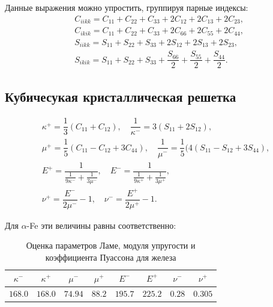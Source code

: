 \documentclass[12pt,a4paper]{article}
\begin{document}
 Данные выражения можно упростить, группируя парные индексы:
 \[
    \begin{split}
        &C_{iikk} = C_{11} + C_{22} + C_{33} + 2C_{12} + 2C_{13} + 2C_{23},
        \\
        &C_{ikik} = C_{11} + C_{22} + C_{33} + 2C_{66} + 2C_{55} + 2C_{44},
        \\
        &S_{iikk} = S_{11} + S_{22} + S_{33} + 2S_{12} + 2S_{13} + 2S_{23},
        \\
        &S_{ikik} = S_{11} + S_{22} + S_{33} + \dfrac{S_{66}}{2} + \dfrac{S_{55}}{2} + \dfrac{S_{44}}{2}.
    \end{split}
 \]

 \subsection{Кубичесукая кристаллическая решетка}
 \begin{gather*}
    \kappa^+ = \dfrac{1}{3}(C_{11} + C_{12}), \quad \dfrac{1}{\kappa^-} = 3(S_{11} + 2S_{12}),
    \\[0.7em]
    \mu^+ = \dfrac{1}{5}(C_{11} - C_{12} + 3C_{44}), \quad \dfrac{1}{\mu^-} = \dfrac{1}{5}(4(S_{11} - S_{12} + 3S_{44}),
    \\[0.7em]
    E^+ = \dfrac{1}{\tfrac{1}{9 \kappa^-} + \tfrac{1}{3\mu^-}}, \quad E^- = \dfrac{1}{\tfrac{1}{9 \kappa^+} + \tfrac{1}{3\mu^+}},
    \\[0.7em]
    \nu^+ = \dfrac{E^-}{2\mu^-} - 1, \quad \nu^- = \dfrac{E^+}{2\mu^+} - 1.
 \end{gather*}

 Для $\alpha$-Fe эти величины равны соответственно:
 \begin{table}[h!]
    \centering
    \caption{Оценка параметров Ламе, модуля упругости и коэффициента Пуассона для железа}
    \vspace{3mm}
    \begin{tabular}{|c|c|c|c|c|c|c|c|}
        \hline 
        $\kappa^-$ & $\kappa^+$ & $\mu^-$ & $\mu^+$ & $E^-$ & $E^+$ & $\nu^-$ & $\nu^+$ \\
        \hline 
        $168.0$ & $168.0$ & $74.94$ & $88.2$ & $195.7$ & $225.2$ & $0.28$ & $0.305$ \\
        \hline
    \end{tabular}
 \end{table}
\end{document}
